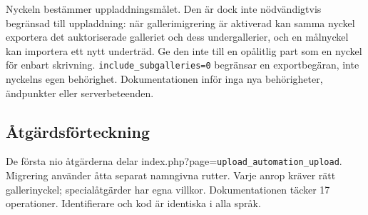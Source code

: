 \documentclass[11pt,a4paper]{article}
\newcommand{\codeword}[1]{\nolinkurl{#1}}
\begin{document}
Nyckeln bestämmer uppladdningsmålet. Den är dock inte nödvändigtvis begränsad till
uppladdning: när gallerimigrering är aktiverad kan samma nyckel exportera det auktoriserade
galleriet och dess undergallerier, och en målnyckel kan importera ett nytt underträd. Ge den
inte till en opålitlig part som en nyckel för enbart skrivning.
\codeword{include_subgalleries=0} begränsar en exportbegäran, inte nyckelns egen behörighet.
Dokumentationen inför inga nya behörigheter, ändpunkter eller serverbeteenden.

\subsection{\texorpdfstring{Åtgärdsförteckning}{Åtgärdsförteckning}}

\label{api352:operation-index}

De första nio åtgärderna delar index.php?page=\codeword{upload_automation_upload}. Migrering
använder åtta separat namngivna rutter. Varje anrop kräver rätt gallerinyckel;
specialåtgärder har egna villkor. Dokumentationen täcker 17 operationer. Identifierare och
kod är identiska i alla språk.
\end{document}
